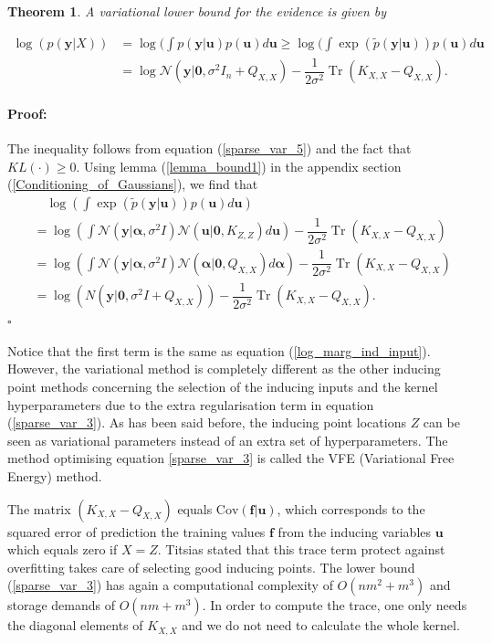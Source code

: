 \documentclass[12pt,a4paper,oneside]{book}
\newtheorem{Theorem}{Theorem}
\newenvironment{proof}{\paragraph{Proof:}}{\hfill$\square$}
\DeclareMathOperator{\Tr}{Tr}
\begin{document}
\begin{Theorem}
A variational lower bound for the evidence is given by

\begin{align}\label{sparse_var_3}
\log(p(\bm{y}|X)) &= \log( \int p(\bm{y}|\bm{u})p(\bm{u})d\bm{u} \geq \log(\int \exp(\tilde{p}(\bm{y}|\bm{u})) p(\bm{u}) d\bm{u} \nonumber \\
&= \log \mathcal{N} (\bm{y}|\bm{0},\sigma^2 I_n + Q_{X,X}) - \dfrac{1}{2 \sigma^2} \Tr (K_{X,X} - Q_{X,X}).
\end{align}

\end{Theorem}

\begin{proof}
The inequality follows from equation (\ref{sparse_var_5}) and the fact that $KL(\cdot) \geq 0$. Using lemma (\ref{lemma_bound1}) in the appendix section (\ref{Conditioning_of_Gaussians}), we find that 
\begin{align}
 & \quad \log(\int \exp(\tilde{p}(\bm{y}|\bm{u})) p(\bm{u}) d\bm{u}) \nonumber \\ &= \log \left( \int  \mathcal{N}(\bm{y} | \bm{\alpha}, \sigma^2 I ) \mathcal{N}(\bm{u} | \bm{0}, K_{Z,Z} ) d \bm{u} \right)  - \dfrac{1}{2 \sigma^2} \Tr ( K_{X,X} - Q_{X,X}) \nonumber \\   &= \log  \left( \int  \mathcal{N}(\bm{y} | \bm{\alpha}, \sigma^2 I ) \mathcal{N}(\bm{\alpha} | \bm{0}, Q_{X,X} ) d \bm{\alpha} \right)  - \dfrac{1}{2 \sigma^2} \Tr ( K_{X,X} - Q_{X,X}) \nonumber \\ &= \log {(N(\bm{y}|\bm{0}, \sigma^2 I + Q_{X,X}))- \dfrac{1}{2 \sigma^2} \Tr (K_{X,X} - Q_{X,X})}.
\end{align}
\end{proof}

Notice that the first term is the same as equation (\ref{log_marg_ind_input}). However, the variational method is completely different as the other inducing point methods concerning the selection of the inducing inputs and the kernel hyperparameters due to the extra regularisation term in equation (\ref{sparse_var_3}). As has been said before, the inducing point locations $Z$ can be seen as variational parameters instead of an extra set of hyperparameters. The method optimising equation \ref{sparse_var_3} is called the VFE (Variational Free Energy) method.

The matrix $(K_{X,X} - Q_{X,X})$ equals $\text{Cov}(\bm{f}|\bm{u})$, which corresponds to the squared error of prediction the training values $\bm{f}$ from the inducing variables $\bm{u}$ which equals zero if $X=Z$. Titsias stated that this trace term protect against overfitting takes care of selecting good inducing points. The lower bound (\ref{sparse_var_3}) has again a computational complexity of $O(nm^2 + m^3)$ and storage demands of $O(nm + m^3)$. In order to compute the trace, one only needs the diagonal elements of $K_{X,X}$ and we do not need to calculate the whole kernel. 
\end{document}
